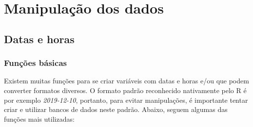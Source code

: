\documentclass[
]{book}
\theoremstyle{definition}
\theoremstyle{definition}
\theoremstyle{definition}
\theoremstyle{definition}
\theoremstyle{remark}
\begin{document}
\hypertarget{manipulauxe7uxe3o-dos-dados}{%
\chapter{Manipulação dos dados}\label{manipulauxe7uxe3o-dos-dados}}

\hypertarget{datas-e-horas}{%
\section{Datas e horas}\label{datas-e-horas}}

\hypertarget{funuxe7uxf5es-buxe1sicas}{%
\subsection{Funções básicas}\label{funuxe7uxf5es-buxe1sicas}}

Existem muitas funções para se criar variáveis com datas e horas e/ou que podem converter formatos diversos. O formato padrão reconhecido nativamente pelo R é por exemplo \emph{2019-12-10}, portanto, para evitar manipulações, é importante tentar criar e utilizar bancos de dados neste padrão. Abaixo, seguem algumas das funções mais utilizadas:
\end{document}
